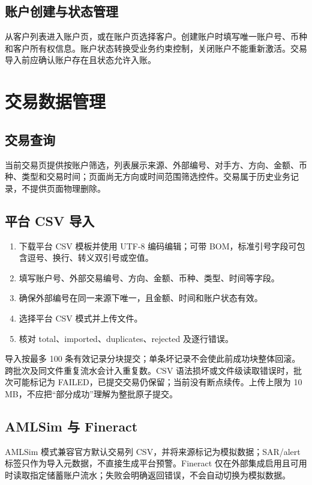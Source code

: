 \documentclass[UTF8,openany,zihao=-4]{ctexrep}
\begin{document}
\section{账户创建与状态管理}
从客户列表进入账户页，或在账户页选择客户。创建账户时填写唯一账户号、币种和客户所有权信息。账户状态转换受业务约束控制，关闭账户不能重新激活。交易导入前应确认账户存在且状态允许入账。

\chapter{交易数据管理}
\section{交易查询}
当前交易页提供按账户筛选，列表展示来源、外部编号、对手方、方向、金额、币种、类型和交易时间；页面尚无方向或时间范围筛选控件。交易属于历史业务记录，不提供页面物理删除。

\section{平台 CSV 导入}
\begin{enumerate}
\item 下载平台 CSV 模板并使用 UTF-8 编码编辑；可带 BOM，标准引号字段可包含逗号、换行、转义双引号或空值。
\item 填写账户号、外部交易编号、方向、金额、币种、类型、时间等字段。
\item 确保外部编号在同一来源下唯一，且金额、时间和账户状态有效。
\item 选择平台 CSV 模式并上传文件。
\item 核对 total、imported、duplicates、rejected 及逐行错误。
\end{enumerate}
导入按最多 100 条有效记录分块提交；单条坏记录不会使此前成功块整体回滚。跨批次及同文件重复流水会计入重复数。CSV 语法损坏或文件级读取错误时，批次可能标记为 FAILED，已提交交易仍保留；当前没有断点续传。上传上限为 10 MB，不应把“部分成功”理解为整批原子提交。

\section{AMLSim 与 Fineract}
AMLSim 模式兼容官方默认交易列 CSV，并将来源标记为模拟数据；SAR/alert 标签只作为导入元数据，不直接生成平台预警。Fineract 仅在外部集成启用且可用时读取指定储蓄账户流水；失败会明确返回错误，不会自动切换为模拟数据。
\end{document}
